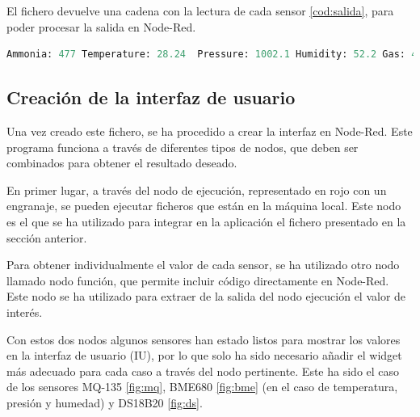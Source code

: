 El fichero devuelve una cadena con la lectura de cada sensor \ref{cod:salida}, para poder procesar la salida en Node-Red.\\
\begin{code}[h]
\begin{lstlisting}[language=Python]
Ammonia: 477 Temperature: 28.24  Pressure: 1002.1 Humidity: 52.2 Gas: 4005.9 Water level: 2 Waterproof temp: 28.312 Pixels: [[23.5, 23.0, 23.0, 23.25, 23.0, 23.75, 23.75, 24.0], [24.0, 23.25, 23.0, 19.5, 19.5, 19.75, 19.5, 21.0], [19.0, 19.0, 20.0, 19.75, 20.0, 20.25, 19.0, 19.0], [19.25, 19.75, 18.75, 19.25, 18.25, 19.0, 19.75, 20.0], [17.75, 18.75, 18.75, 19.0, 19.25, 21.5, 22.25, 21.25], [21.5, 21.25, 22.25, 21.75, 21.75, 18.75, 18.25, 18.5], [18.5, 18.75, 18.75, 18.5, 18.5, 18.5, 21.75, 22.75], [21.25, 22.25, 21.75, 21.75, 21.75, 21.75, 21.75, 23.0]]
\end{lstlisting}
\caption[Ejemplo de salida del fichero Python]{Ejemplo de salida del fichero Python}
\label{cod:salida}
\end{code}

\subsection{Creación de la interfaz de usuario}
Una vez creado este fichero, se ha procedido a crear la interfaz en Node-Red. Este programa funciona a través de diferentes tipos de nodos, que deben ser combinados para obtener el resultado deseado.

En primer lugar, a través del nodo de ejecución, representado en rojo con un engranaje, se pueden ejecutar ficheros que están en la máquina local. Este nodo es el que se ha utilizado para integrar en la aplicación el fichero presentado en la sección anterior.

Para obtener individualmente el valor de cada sensor, se ha utilizado otro nodo llamado nodo función, que permite incluir código directamente en Node-Red. Este nodo se ha utilizado para extraer de la salida del nodo ejecución el valor de interés.

Con estos dos nodos algunos sensores han estado listos para mostrar los valores en la interfaz de usuario (IU), por lo que solo ha sido necesario añadir el widget más adecuado para cada caso a través del nodo pertinente. Este ha sido el caso de los sensores MQ-135 \ref{fig:mq}, BME680 \ref{fig:bme} (en el caso de temperatura, presión y humedad) y DS18B20 \ref{fig:ds}.

